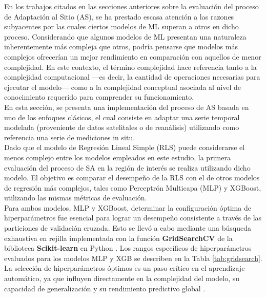 En los trabajos citados en las secciones anteriores sobre la evaluación del proceso de Adaptación al Sitio (AS), se ha prestado escasa atención a las razones subyacentes por las cuales ciertos modelos de ML superan a otros en dicho proceso. Considerando que algunos modelos de ML presentan una naturaleza inherentemente más compleja que otros, podría pensarse que modelos más complejos ofrecerían un mejor rendimiento en comparación con aquellos de menor complejidad. En este contexto, el término complejidad hace referencia tanto a la complejidad computacional —es decir, la cantidad de operaciones necesarias para ejecutar el modelo— como a la complejidad conceptual asociada al nivel de conocimiento requerido para comprender su funcionamiento.\\

En esta sección, se presenta una implementación del proceso de AS basada en uno de los enfoques clásicos, el cual consiste en adaptar una serie temporal modelada (proveniente de datos satelitales o de reanálisis) utilizando como referencia una serie de mediciones in situ.\\

Dado que el modelo de Regresión Lineal Simple (RLS) puede considerarse el menos complejo entre los modelos empleados en este estudio, la primera evaluación del proceso de SA en la región de interés se realiza utilizando dicho modelo. El objetivo es comparar el desempeño de la RLS con el de otros modelos de regresión más complejos, tales como Perceptrón Multicapa (MLP) y XGBoost, utilizando las mismas métricas de evaluación.\\


Para ambos modelos, MLP y XGBoost, determinar la configuración óptima de hiperparámetros fue esencial para lograr un desempeño consistente a través de las particiones de validación cruzada. Esto se llevó a cabo mediante una búsqueda exhaustiva en rejilla implementada con la función \textbf{GridSearchCV} de la biblioteca \textbf{Scikit-learn} en Python \cite{Pedregosa2012}. Los rangos específicos de hiperparámetros evaluados para los modelos MLP y XGB se describen en la Tabla \ref{tab:gridsearch}. La selección de hiperparámetros óptimos es un paso crítico en el aprendizaje automático, ya que influyen directamente en la complejidad del modelo, su capacidad de generalización y su rendimiento predictivo global \cite{Goodfellow2016}.


